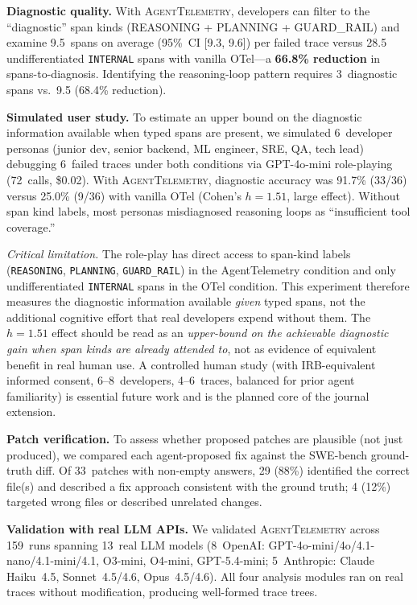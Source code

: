\documentclass[sigconf,screen]{acmart}
\begin{document}
\textbf{Diagnostic quality.}
With \textsc{AgentTelemetry}, developers can filter to the
``diagnostic'' span kinds (REASONING + PLANNING + GUARD\_RAIL) and
examine 9.5~spans on average (95\%~CI [9.3, 9.6]) per failed trace
versus 28.5 undifferentiated \texttt{INTERNAL} spans with vanilla
OTel---a \textbf{66.8\% reduction} in spans-to-diagnosis.  Identifying
the reasoning-loop pattern requires 3~diagnostic spans
vs.\ 9.5 (68.4\% reduction).

\textbf{Simulated user study.}
To estimate an upper bound on the diagnostic information available
when typed spans are present, we simulated 6~developer
personas (junior dev, senior backend, ML engineer, SRE, QA, tech lead)
debugging 6~failed traces under both conditions via GPT-4o-mini
role-playing (72~calls, \$0.02).  With \textsc{AgentTelemetry},
diagnostic accuracy was 91.7\% (33/36) versus 25.0\% (9/36) with
vanilla OTel (Cohen's $h = 1.51$, large effect).  Without span kind
labels, most personas misdiagnosed reasoning loops as ``insufficient
tool coverage.''

\emph{Critical limitation.} The role-play has direct access to span-kind
labels (\texttt{REASONING}, \texttt{PLANNING}, \texttt{GUARD\_RAIL}) in
the AgentTelemetry condition and only undifferentiated
\texttt{INTERNAL} spans in the OTel condition.  This experiment
therefore measures the diagnostic information available \emph{given}
typed spans, not the additional cognitive effort that real developers
expend without them.  The $h{=}1.51$ effect should be read as an
\emph{upper-bound on the achievable diagnostic gain when span kinds are
already attended to}, not as evidence of equivalent benefit in real
human use.  A controlled human study (with IRB-equivalent informed
consent, 6--8~developers, 4--6~traces, balanced for prior agent
familiarity) is essential future work and is the planned core of the
journal extension.

\textbf{Patch verification.}
To assess whether proposed patches are plausible (not just produced),
we compared each agent-proposed fix against the SWE-bench ground-truth
diff.  Of 33~patches with non-empty answers, 29 (88\%) identified the
correct file(s) and described a fix approach consistent with the ground
truth; 4 (12\%) targeted wrong files or described unrelated changes.

\textbf{Validation with real LLM APIs.}
We validated \textsc{AgentTelemetry} across 159~runs spanning 13~real
LLM models (8~OpenAI: GPT-4o-mini/4o/4.1-nano/4.1-mini/4.1, O3-mini,
O4-mini, GPT-5.4-mini; 5~Anthropic: Claude Haiku~4.5,
Sonnet~4.5/4.6, Opus~4.5/4.6).  All four analysis modules ran on real
traces without modification, producing well-formed trace trees.
\end{document}
